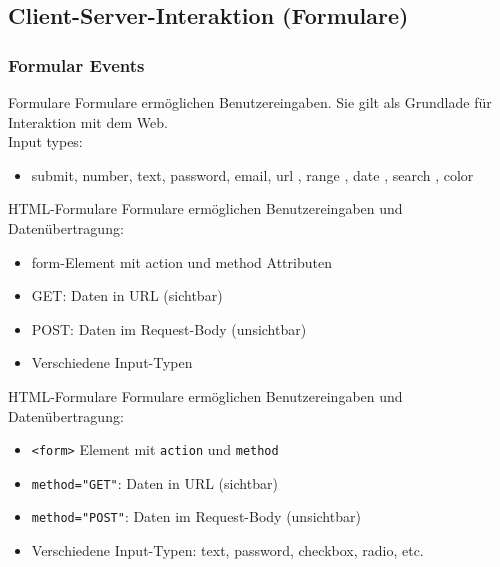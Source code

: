 \columnbreak

\subsection{Client-Server-Interaktion (Formulare)}

\subsubsection{Formular Events}

\begin{definition}{Formulare}
Formulare ermöglichen Benutzereingaben. Sie gilt als Grundlade für Interaktion mit dem Web.\\
Input types:

\begin{itemize}
\item submit, number, text, password, email, url , range , date , search , color
\end{itemize}
\end{definition}

\begin{definition}{HTML-Formulare}
    Formulare ermöglichen Benutzereingaben und Datenübertragung:
    \begin{itemize}
        \item form-Element mit action und method Attributen
        \item GET: Daten in URL (sichtbar)
        \item POST: Daten im Request-Body (unsichtbar)
        \item Verschiedene Input-Typen
    \end{itemize}
\end{definition}

\begin{definition}{HTML-Formulare}
    Formulare ermöglichen Benutzereingaben und Datenübertragung:
    \begin{itemize}
        \item \texttt{<form>} Element mit \texttt{action} und \texttt{method}
        \item \texttt{method="GET"}: Daten in URL (sichtbar)
        \item \texttt{method="POST"}: Daten im Request-Body (unsichtbar)
        \item Verschiedene Input-Typen: text, password, checkbox, radio, etc.
    \end{itemize}
\end{definition}

